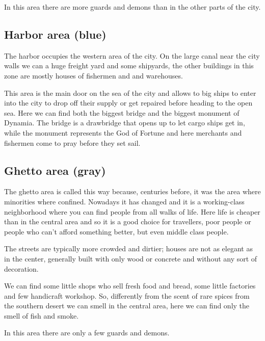 In this area there are more guards and demons than in the other parts of the city.

\subsection{Harbor area (blue)}
The harbor occupies the western area of the city. On the large canal near the city walls we can a huge freight yard and some shipyards, the  other buildings in this zone are mostly houses of fishermen and and warehouses.

This area is the main door on the sea of the city and allows to big ships to enter into the city to drop off their supply or get repaired before heading to the open sea. Here we can find both the biggest bridge and the biggest monument of Dynamia. The bridge is a drawbridge that opens up to let cargo ships get in, while the monument represents the God of Fortune and here merchants and fishermen come to pray before they set sail.

\subsection{Ghetto area (gray)}
The ghetto area is called this way because, centuries before, it was the area where  minorities where confined. Nowadays it has changed and it is a working-class neighborhood where you can find people from all walks of life. Here life is cheaper than in the central area and so it is a good choice for travellers, poor people or people who can't afford something better, but even middle class people.

The streets are typically more crowded and dirtier; houses are not as elegant as in the center, generally built with only wood or concrete and without any sort of decoration.

We can find some little shops who sell fresh food and bread, some little factories and few handicraft workshop. So, differently from the scent of rare spices from the southern desert we can smell in the central area, here we can find only the smell of fish and smoke.

In this area there are only a few guards and demons.
